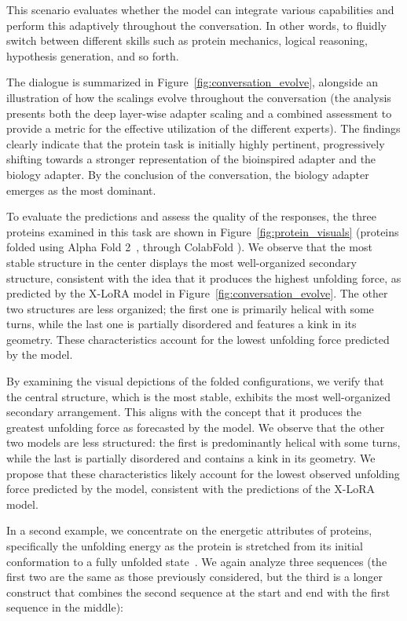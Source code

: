 This scenario evaluates whether the model can integrate various capabilities and perform this adaptively throughout the conversation. In other words, to fluidly switch between different skills such as protein mechanics, logical reasoning, hypothesis generation, and so forth.

The dialogue is summarized in Figure~\ref{fig:conversation_evolve}, alongside an illustration of how the scalings evolve throughout the conversation (the analysis presents both the deep layer-wise adapter scaling and a combined assessment to provide a metric for the effective utilization of the different experts). The findings clearly indicate that the protein task is initially highly pertinent, progressively shifting towards a stronger representation of the bioinspired adapter and the biology adapter. By the conclusion of the conversation, the biology adapter emerges as the most dominant.

To evaluate the predictions and assess the quality of the responses, the three proteins examined in this task are shown in Figure~\ref{fig:protein_visuals} (proteins folded using Alpha Fold 2~\cite{Jumper2021HighlyAlphaFoldb}, through ColabFold \cite{Mirdita2022ColabFold:All}). We observe that the most stable structure in the center displays the most well-organized secondary structure, consistent with the idea that it produces the highest unfolding force, as predicted by the X-LoRA model in Figure~\ref{fig:conversation_evolve}. The other two structures are less organized; the first one is primarily helical with some turns, while the last one is partially disordered and features a kink in its geometry. These characteristics account for the lowest unfolding force predicted by the model.

By examining the visual depictions of the folded configurations, we verify that the central structure, which is the most stable, exhibits the most well-organized secondary arrangement. This aligns with the concept that it produces the greatest unfolding force as forecasted by the model. We observe that the other two models are less structured: the first is predominantly helical with some turns, while the last is partially disordered and contains a kink in its geometry. We propose that these characteristics likely account for the lowest observed unfolding force predicted by the model, consistent with the predictions of the X-LoRA model.

In a second example, we concentrate on the energetic attributes of proteins, specifically the unfolding energy as the protein is stretched from its initial conformation to a fully unfolded state~\cite{Ni2023ForceGen:Model}. We again analyze three sequences (the first two are the same as those previously considered, but the third is a longer construct that combines the second sequence at the start and end with the first sequence in the middle):

